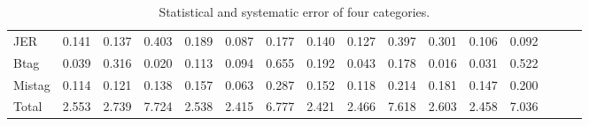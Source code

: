 \begin{sidewaystable}[p]
\begin{tabular}{|l|ccc|ccc|ccc|ccc|ccc|}
  JER                                        & 0.141 & 0.137 & 0.403 & 0.189 & 0.087 & 0.177 & 0.140 & 0.127 & 0.397 & 0.301 & 0.106 & 0.092 \\ 
  Btag                                       & 0.039 & 0.316 & 0.020 & 0.113 & 0.094 & 0.655 & 0.192 & 0.043 & 0.178 & 0.016 & 0.031 & 0.522 \\ 
  Mistag                                     & 0.114 & 0.121 & 0.138 & 0.157 & 0.063 & 0.287 & 0.152 & 0.118 & 0.214 & 0.181 & 0.147 & 0.200 \\ 
  \hline
  Total                                      & 2.553 & 2.739 & 7.724 & 2.538 & 2.415 & 6.777 & 2.421 & 2.466 & 7.618 & 2.603 & 2.458 & 7.036 \\ 
  \hline
  \end{tabular}
  \caption{ Statistical and systematic error of four categories. }
  \label{tab:syst_alt}
\end{sidewaystable}

